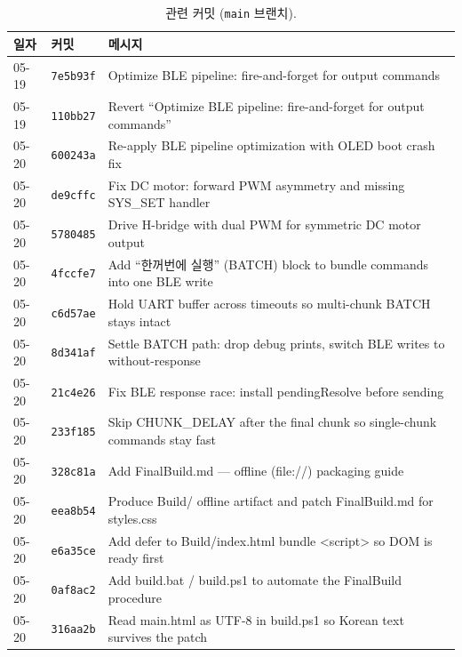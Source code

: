 \documentclass[11pt, oneside]{article}
\begin{document}
\begin{table}[h]
\centering
\small
\begin{tabularx}{\linewidth}{@{}llX@{}}
\toprule
일자 & 커밋 & 메시지 \\
\midrule
05-19 & \texttt{7e5b93f} & Optimize BLE pipeline: fire-and-forget for output commands \\
05-19 & \texttt{110bb27} & Revert ``Optimize BLE pipeline: fire-and-forget for output commands'' \\
05-20 & \texttt{600243a} & Re-apply BLE pipeline optimization with OLED boot crash fix \\
05-20 & \texttt{de9cffc} & Fix DC motor: forward PWM asymmetry and missing SYS\_SET handler \\
05-20 & \texttt{5780485} & Drive H-bridge with dual PWM for symmetric DC motor output \\
05-20 & \texttt{4fccfe7} & Add ``한꺼번에 실행'' (BATCH) block to bundle commands into one BLE write \\
05-20 & \texttt{c6d57ae} & Hold UART buffer across timeouts so multi-chunk BATCH stays intact \\
05-20 & \texttt{8d341af} & Settle BATCH path: drop debug prints, switch BLE writes to without-response \\
05-20 & \texttt{21c4e26} & Fix BLE response race: install pendingResolve before sending \\
05-20 & \texttt{233f185} & Skip CHUNK\_DELAY after the final chunk so single-chunk commands stay fast \\
05-20 & \texttt{328c81a} & Add FinalBuild.md --- offline (file://) packaging guide \\
05-20 & \texttt{eea8b54} & Produce Build/ offline artifact and patch FinalBuild.md for styles.css \\
05-20 & \texttt{e6a35ce} & Add defer to Build/index.html bundle <script> so DOM is ready first \\
05-20 & \texttt{0af8ac2} & Add build.bat / build.ps1 to automate the FinalBuild procedure \\
05-20 & \texttt{316aa2b} & Read main.html as UTF-8 in build.ps1 so Korean text survives the patch \\
\bottomrule
\end{tabularx}
\caption{관련 커밋 (\texttt{main} 브랜치).}
\end{table}
\end{document}
